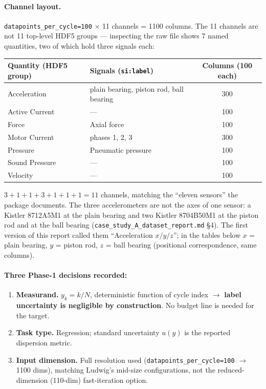 \documentclass[11pt]{article}
\newcommand{\code}[1]{\texttt{#1}}
\begin{document}
\paragraph{Channel layout.} \code{datapoints\_per\_cycle=100} $\times$ 11
channels = 1100 columns. The 11 channels are not 11 top-level HDF5 groups ---
inspecting the raw file shows 7 named quantities, two of which hold three
signals each:

\begin{center}
\begin{tabular}{@{}llc@{}}
\toprule
Quantity (HDF5 group) & Signals (\texttt{si:label}) & Columns (100 each) \\
\midrule
Acceleration & plain bearing, piston rod, ball bearing & 300 \\
Active Current & --- & 100 \\
Force & Axial force & 100 \\
Motor Current & phases 1, 2, 3 & 300 \\
Pressure & Pneumatic pressure & 100 \\
Sound Pressure & --- & 100 \\
Velocity & --- & 100 \\
\bottomrule
\end{tabular}
\end{center}

\noindent $3+1+1+3+1+1+1=11$ channels, matching the ``eleven sensors'' the
package documents. The three accelerometers are not the axes of one sensor: a Kistler 8712A5M1 at the
plain bearing and two Kistler 8704B50M1 at the piston rod and at the ball
bearing (\texttt{case\_\allowbreak study\_\allowbreak A\_\allowbreak dataset\_\allowbreak report.md} \S4). The first version
of this report called them ``Acceleration $x/y/z$''; in the tables below
$x$ = plain bearing, $y$ = piston rod, $z$ = ball bearing (positional
correspondence, same columns).

\paragraph{Three Phase-1 decisions recorded:}
\begin{enumerate}
\item \textbf{Measurand.} $y_k = k/N$, deterministic function of cycle index
$\rightarrow$ \textbf{label uncertainty is negligible by construction}. No
budget line is needed for the target.
\item \textbf{Task type.} Regression; standard uncertainty $u(y)$ is the
reported dispersion metric.
\item \textbf{Input dimension.} Full resolution used
(\code{datapoints\_per\_cycle=100} $\rightarrow$ 1100 dims), matching
Ludwig's mid-size configurations, not the reduced-dimension (110-dim)
fast-iteration option.
\end{enumerate}
\end{document}
